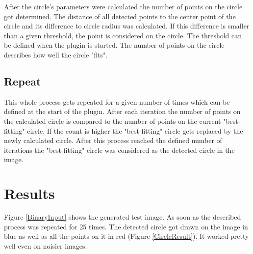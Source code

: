 After the circle's parameters were calculated the number of points on the circle got determined. The distance of all detected points to the center point of the circle and its difference to circle radius was calculated. If this difference is smaller than a given threshold, the point is considered on the circle. The threshold can be defined when the plugin is started. The number of points on the circle describes how well the circle "fits".

\subsection{Repeat}

This whole process gets repeated for a given number of times which can be defined at the start of the plugin. After each iteration the number of points on the calculated circle is compared to the number of points on the current "best-fitting" circle. If the count is higher the "best-fitting" circle gets replaced by the newly calculated circle. After this process reached the defined number of iterations the "best-fitting" circle was considered as the detected circle in the image.

\section{Results}
 
Figure \ref{BinaryInput} shows the generated test image. As soon as the described process was repeated for 25 times. The detected circle got drawn on the image in blue as well as all the points on it in red (Figure \ref{CircleResult}). It worked pretty well even on noisier images.

